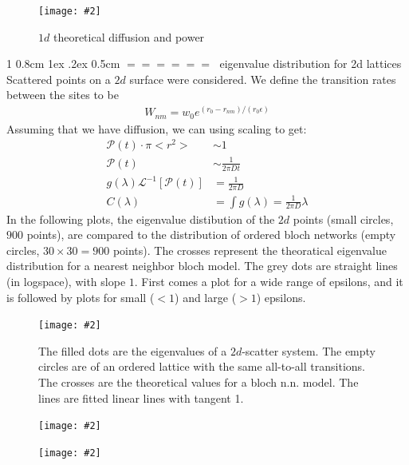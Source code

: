 \documentclass[onecolumn,fleqn,notitlepage,secnumarabic]{revtex4}
\makeatletter
\def\section{%
  \@startsection
    {section}%
    {1}%
    {\z@}%
    {0.8cm \@plus1ex \@minus .2ex}%
    {0.5cm}%
    {\Large\bf $=\!=\!=\!=\!=\!=\;$}%
}%
\newcommand{\dontincludegraphics}[2][]{\texttt{[image: \#2]}}
\makeatother
\begin{document}
\begin{figure}[H]
\dontincludegraphics[clip, width=0.9\hsize]{alexander_1d_theory}
\caption{$1d$ theoretical diffusion and power}
\end{figure}

\section{eigenvalue distribution for 2d lattices}
Scattered points on a $2d$ surface were considered. We define the transition rates between the sites to be 
\begin{align}   W_{nm} = w_0 e^{(r_0 - r_{nm})/(r_0\epsilon)} \end{align}  
Assuming that we have diffusion, we can using scaling to get:
\begin{align} 
    \mathcal{P}(t) \cdot \pi <r^2> &\sim 1 \\
    \mathcal{P}(t) &\sim \frac{1}{2\pi Dt}\\
    g(\lambda)\mathcal{L}^{-1}\left[\mathcal{P}(t)\right]&= \frac{1}{2\pi D} \\
    C(\lambda) &= \int g(\lambda) = \frac{1}{2\pi D}\lambda
\end{align}
In the following plots, the eigenvalue distibution of the $2d$ points (small circles, $900$ points), are compared to the distribution of ordered bloch networks (empty circles, $30\times30=900$ points). The crosses represent the theoratical eigenvalue distribution for a nearest neighbor bloch model. The grey dots are straight lines (in logspace), with slope $1$. First comes a plot for a wide range of epsilons, and it is followed by plots for small ($<1$) and large ($>1$) epsilons.

\begin{figure}[H]
\dontincludegraphics[clip, width=0.9\hsize]{scatter_and_bloch_2d}
\caption{The filled dots are the eigenvalues of a $2d$-scatter system. The empty circles are of an ordered lattice with the same all-to-all transitions. The crosses are the theoretical values for a bloch n.n. model. The lines are fitted linear lines with tangent 1.}
\end{figure}
\begin{figure}[H]
\dontincludegraphics[clip, width=0.9\hsize]{scatter_and_bloch_2d_small}
\caption{}
\end{figure}
\begin{figure}[H]
\dontincludegraphics[clip, width=0.9\hsize]{scatter_and_bloch_2d_large}
\end{figure}
\end{document}
